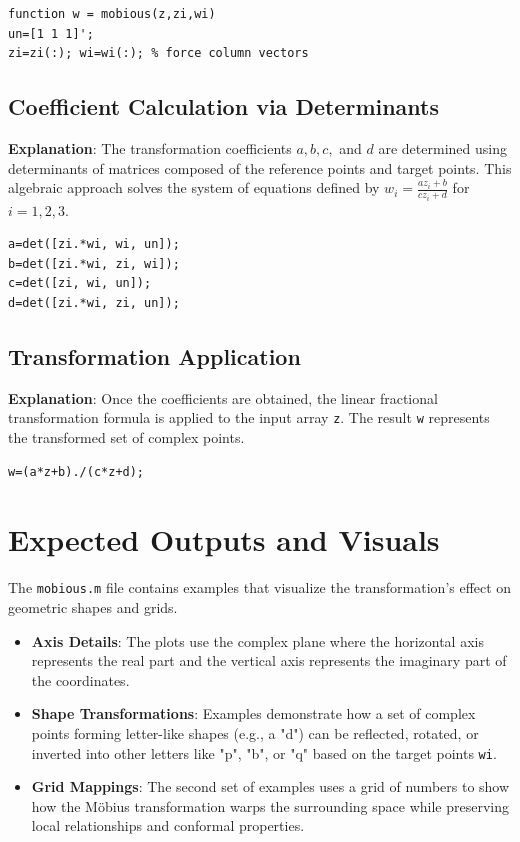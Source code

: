 \begin{lstlisting}
function w = mobious(z,zi,wi)
un=[1 1 1]';
zi=zi(:); wi=wi(:); % force column vectors
\end{lstlisting}

\subsection{Coefficient Calculation via Determinants}
\textbf{Explanation}: The transformation coefficients $a, b, c,$ and $d$ are determined using determinants of matrices composed of the reference points and target points. This algebraic approach solves the system of equations defined by $w_i = \frac{az_i+b}{cz_i+d}$ for $i=1, 2, 3$.

\begin{lstlisting}
a=det([zi.*wi, wi, un]);
b=det([zi.*wi, zi, wi]);
c=det([zi, wi, un]);
d=det([zi.*wi, zi, un]);
\end{lstlisting}

\subsection{Transformation Application}
\textbf{Explanation}: Once the coefficients are obtained, the linear fractional transformation formula is applied to the input array \texttt{z}. The result \texttt{w} represents the transformed set of complex points.

\begin{lstlisting}
w=(a*z+b)./(c*z+d);
\end{lstlisting}

\section{Expected Outputs and Visuals}

The \texttt{mobious.m} file contains examples that visualize the transformation's effect on geometric shapes and grids. 



\begin{itemize}
    \item \textbf{Axis Details}: The plots use the complex plane where the horizontal axis represents the real part and the vertical axis represents the imaginary part of the coordinates.
    \item \textbf{Shape Transformations}: Examples demonstrate how a set of complex points forming letter-like shapes (e.g., a "d") can be reflected, rotated, or inverted into other letters like "p", "b", or "q" based on the target points \texttt{wi}.
    \item \textbf{Grid Mappings}: The second set of examples uses a grid of numbers to show how the M\"{o}bius transformation warps the surrounding space while preserving local relationships and conformal properties.
\end{itemize}
